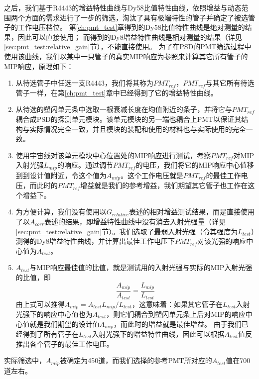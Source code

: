 之后，我们基于R4443的增益特性曲线与Dy58比值特性曲线，依照增益与动态范围两个方面的需求进行了一步的筛选，淘汰了具有极端特性的管子并确定了被选管子的工作电压档位。
第\ref{ch:pmt_test}章得到的Dy58比值特性曲线是绝对测量的结果，因此可以直接使用；
而得到的Dy8增益特性曲线是相对测量的结果（详见\ref{sec:pmt_test:relative_gain}节），不能直接使用。
为了在PSD的PMT筛选过程中使用该曲线，我们以某中一只管子的真实MIP响应为参照来计算其它所有管子的MIP响应，原理如下：
\begin{enumerate}
	\item 从待选管子中任选一支R4443，我们将其称为$PMT_{ref}$，$PMT_{ref}$与其它所有待选管子一样，在第\ref{ch:pmt_test}章中已经得到了它的增益特性曲线。
	\item 从待选的塑闪单元条中选取一根衰减长度在均值附近的条子，并将它与$PMT_{ref}$耦合成PSD的探测单元模块。该单元模块的另一端也耦合上PMT以保证其结构与实际情况完全一致，并且模块的装配和使用的材料也与实际使用的完全一致。
	\item 使用宇宙线对该单元模块中心位置处的MIP响应进行测试，考察$PMT_{ref}$对MIP入射光强$L_{mip}$的响应。通过调节$PMT_{ref}$的电压，我们将它的MIP响应中心值移到到设计值附近，令这个值为$A_{mip}$。这个工作电压就是$PMT_{ref}$的最佳工作电压，而此时的$PMT_{ref}$增益就是我们的参考增益，我们期望其它管子也工作在这个增益下。
	\item 为方便计算，我们没有使用以$G_{relative}$表述的相对增益测试结果，而是直接使用了以$A_{corr}$表述的结果，即增益特性曲线中没有消去入射光强量（详见\ref{sec:pmt_test:relative_gain}节）。我们选取了最弱入射光强（令其强度为$L_{test}$）测得的Dy8增益特性曲线，并计算出最佳工作电压下$PMT_{ref}$对该光强的响应中心值为$A_{test}$。
	\item $A_{test}$与MIP响应最佳值的比值，就是测试用的入射光强与实际的MIP入射光强的比值，即
	\begin{equation}
		\frac{A_{mip}}{A_{test}} = \frac{L_{mip}}{L_{test}}
		\label{eq:construction:pmt_selection}
	\end{equation}
	由上式可以推得$A_{mip}=A_{test}L_{mip}/L_{test}$，这意味着：如果其它管子在$L_{test}$入射光强下的响应中心值也为$A_{test}$，则它们耦合到塑闪单元条上后对MIP的响应中心值就是我们期望的设计值$A_{mip}$，而此时的增益就是最佳增益。
	由于我们已经得到了所有管子在$L_{test}$入射光强下的增益特性曲线，因此可以根据$A_{test}$值反推出各个管子的最佳工作电压。
\end{enumerate}
实际筛选中，$A_{mip}$被确定为450道，而我们选择的参考PMT所对应的$A_{test}$值在700道左右。


